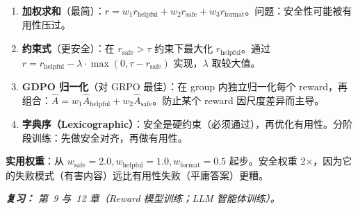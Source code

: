 \begin{questionbox}
\begin{enumerate}
  \item \textbf{加权求和}（最简）：$r = w_1 r_\text{helpful} + w_2 r_\text{safe} + w_3 r_\text{format}$。问题：安全性可能被有用性压过。
  \item \textbf{约束式}（更安全）：在 $r_\text{safe} > \tau$ 约束下最大化 $r_\text{helpful}$。通过 $r = r_\text{helpful} - \lambda \cdot \max(0, \tau - r_\text{safe})$ 实现，$\lambda$ 取较大值。
  \item \textbf{GDPO 归一化}（对 GRPO 最佳）：在 group 内独立归一化每个 reward，再组合：$\hat{A} = w_1 \hat{A}_\text{helpful} + w_2 \hat{A}_\text{safe}$。防止某个 reward 因尺度差异而主导。
  \item \textbf{字典序（Lexicographic）}：安全是硬约束（必须通过），再优化有用性。分阶段训练：先做安全对齐，再做有用性。
\end{enumerate}

\textbf{实用权重}：从 $w_\text{safe}=2.0, w_\text{helpful}=1.0, w_\text{format}=0.5$ 起步。安全权重 2$\times$，因为它的失败模式（有害内容）远比有用性失败（平庸答案）更糟。

\emph{\textbf{复习：} 第~9 与~12 章（Reward 模型训练；LLM 智能体训练）。}
\end{questionbox}

